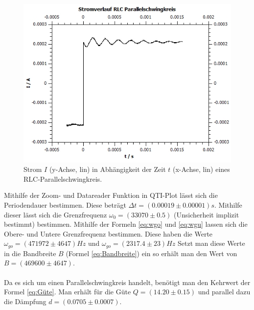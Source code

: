 \documentclass[12pt,a4paper,twoside]{article}
\begin{document}
\begin{figure}[H]
    \centering
    \includegraphics[width=0.6\linewidth]{nudes/Plot a3.jpg}
    \caption{Strom $I$ (y-Achse, lin) in Abhängigkeit der Zeit $t$ (x-Achse, lin) eines RLC-Parallelschwingkreis. }
    \label{fig:plot a3} 
\end{figure}

\noindent
Mithilfe der Zoom- und Datareader Funktion in QTI-Plot lässt sich die Periodendauer bestimmen. Diese beträgt $\Delta t = (0.00019 \pm 0.00001) s$. 
Mithilfe dieser lässt sich die Grenzfrequenz $\omega_0 = (33070 \pm 0.5)$ (Unsicherheit implizit bestimmt) bestimmen. 
Mithilfe der Formeln \ref{eq:wgo} und \ref{eq:wgu} lassen sich die Obere- und Untere Grenzfrequenz bestimmen. 
Diese haben die Werte $\omega_{go} = (471972 \pm 4647) Hz$ und $\omega_{go} = (2317.4 \pm 23) Hz$
Setzt man diese Werte in die Bandbreite $B$ (Formel \ref{eq:Bandbreite}) ein so erhält man den Wert von $B = (469600 \pm 4647)$. 
\\
\\
Da es sich um einen Parallelschwingkreis handelt, benötigt man den Kehrwert der Formel \ref{eq:Güte}. 
Man erhält für die Güte $Q = (14.20 \pm 0.15)$ und parallel dazu die Dämpfung $d = (0.0705 \pm 0.0007)$. 
\end{document}
